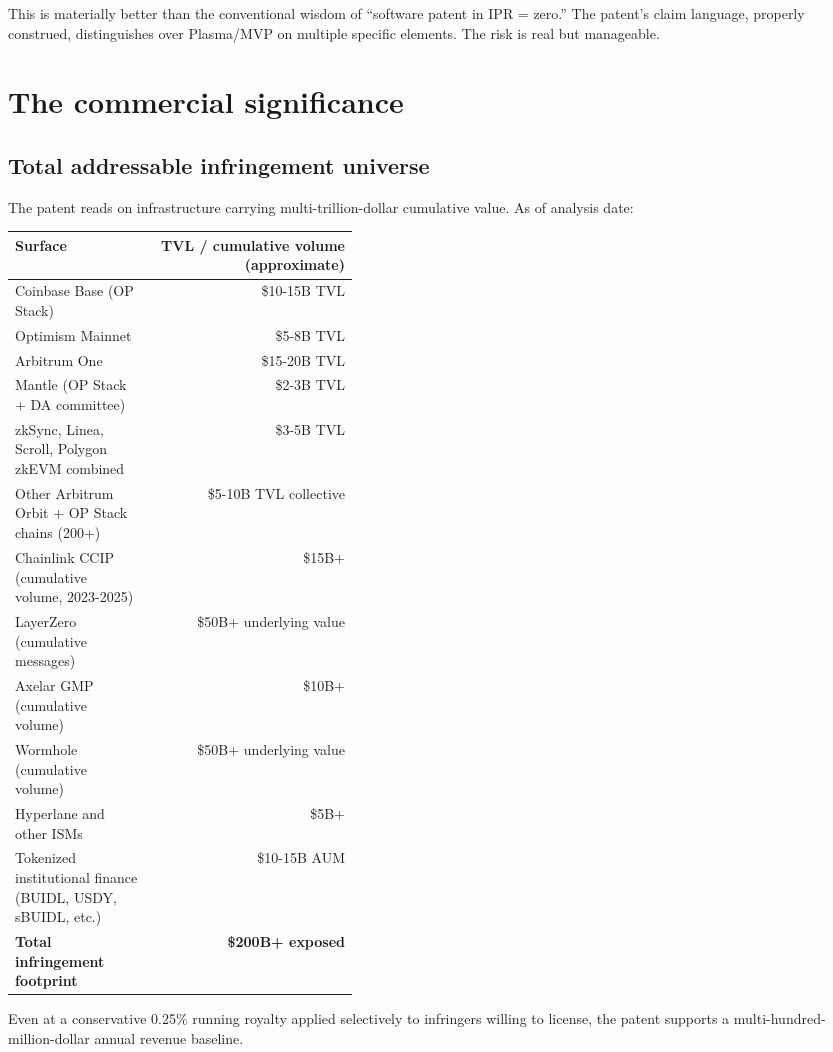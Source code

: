 \documentclass[11pt,letterpaper]{article}
\begin{document}
This is materially better than the conventional wisdom of ``software patent in IPR = zero.'' The patent's claim language, properly construed, distinguishes over Plasma/MVP on multiple specific elements. The risk is real but manageable.

\section{The commercial significance}

\subsection{Total addressable infringement universe}

The patent reads on infrastructure carrying multi-trillion-dollar cumulative value. As of analysis date:

\begin{longtable}{p{0.4\linewidth}r}
\toprule
\textbf{Surface} & \textbf{TVL / cumulative volume (approximate)} \\
\midrule
Coinbase Base (OP Stack) & \$10-15B TVL \\
Optimism Mainnet & \$5-8B TVL \\
Arbitrum One & \$15-20B TVL \\
Mantle (OP Stack + DA committee) & \$2-3B TVL \\
zkSync, Linea, Scroll, Polygon zkEVM combined & \$3-5B TVL \\
Other Arbitrum Orbit + OP Stack chains (200+) & \$5-10B TVL collective \\
Chainlink CCIP (cumulative volume, 2023-2025) & \$15B+ \\
LayerZero (cumulative messages) & \$50B+ underlying value \\
Axelar GMP (cumulative volume) & \$10B+ \\
Wormhole (cumulative volume) & \$50B+ underlying value \\
Hyperlane and other ISMs & \$5B+ \\
Tokenized institutional finance (BUIDL, USDY, sBUIDL, etc.) & \$10-15B AUM \\
\midrule
\textbf{Total infringement footprint} & \textbf{\$200B+ exposed} \\
\bottomrule
\end{longtable}

Even at a conservative 0.25\% running royalty applied selectively to infringers willing to license, the patent supports a multi-hundred-million-dollar annual revenue baseline.
\end{document}
